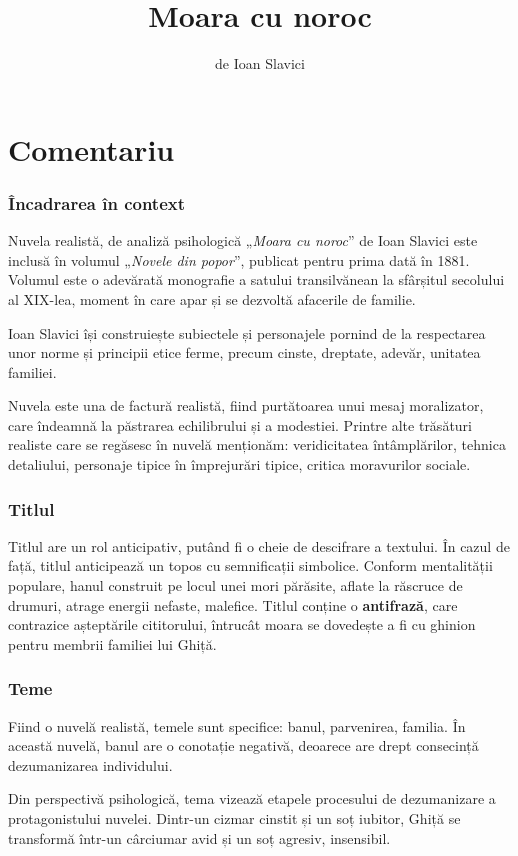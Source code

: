 \documentclass{article}
\title{Moara cu noroc}
\author{de Ioan Slavici}
\date{}
\newcommand{\qu}[1]{„\emph{#1}”}
\begin{document}
\maketitle

\part*{Comentariu}
\section{Încadrarea în context}
Nuvela realistă, de analiză psihologică \qu{Moara cu noroc} de Ioan Slavici este inclusă în volumul \qu{Novele din popor}, publicat pentru prima dată în 1881. Volumul este o adevărată monografie a satului transilvănean la sfârșitul secolului al XIX-lea, moment în care apar și se dezvoltă afacerile de familie.

Ioan Slavici își construiește subiectele și personajele pornind de la respectarea unor norme și principii etice ferme, precum cinste, dreptate, adevăr, unitatea familiei.

Nuvela este una de factură realistă, fiind purtătoarea unui mesaj moralizator, care îndeamnă la păstrarea echilibrului și a modestiei. Printre alte trăsături realiste care se regăsesc în nuvelă menționăm: veridicitatea întâmplărilor, tehnica detaliului, personaje tipice în împrejurări tipice, critica moravurilor sociale.
\section{Titlul}
Titlul are un rol anticipativ, putând fi o cheie de descifrare a textului. În cazul de față, titlul anticipează un topos cu semnificații simbolice. Conform mentalității populare, hanul construit pe locul unei mori părăsite, aflate la răscruce de drumuri, atrage energii nefaste, malefice. Titlul conține o \textbf{antifrază}, care contrazice așteptările cititorului, întrucât moara se dovedește a fi cu ghinion pentru membrii familiei lui Ghiță.

\section{Teme}
Fiind o nuvelă realistă, temele sunt specifice: banul, parvenirea, familia. În această nuvelă, banul are o conotație negativă, deoarece are drept consecință dezumanizarea individului.

Din perspectivă psihologică, tema vizează etapele procesului de dezumanizare a protagonistului nuvelei. Dintr-un cizmar cinstit și un soț iubitor, Ghiță se transformă într-un cârciumar avid și un soț agresiv, insensibil.
\end{document}
